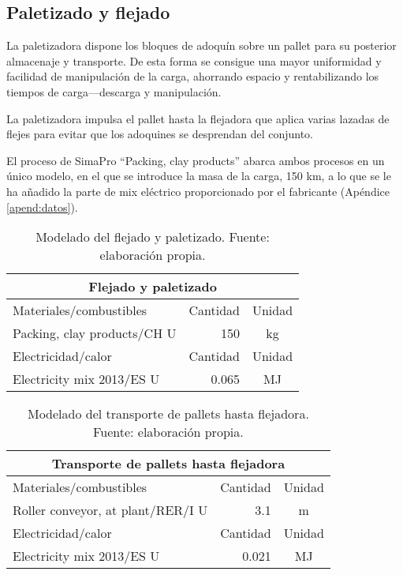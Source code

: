 \subsection{Paletizado y flejado}

La paletizadora dispone los bloques de adoquín sobre un pallet para su posterior almacenaje y transporte. De esta forma se consigue una mayor uniformidad y facilidad de manipulación de la carga, ahorrando espacio y rentabilizando los tiempos de carga—descarga y manipulación.

La paletizadora impulsa el pallet hasta la flejadora que aplica varias lazadas de flejes para evitar que los adoquines se desprendan del conjunto.

El proceso de SimaPro ``Packing, clay products'' abarca ambos procesos en un único modelo, en el que se introduce la masa de la carga, 150 \si{km}, a lo que se le ha añadido la parte de mix eléctrico proporcionado por el fabricante (Apéndice \ref{apend:datos}).

\begin{table}[!htb]
\centering
\begin{tabular}{p{8cm}rc}
\toprule
\multicolumn{3}{c}{Flejado y paletizado}\\
\midrule
Materiales/combustibles & Cantidad & Unidad\\
\midrule
Packing, clay products/CH U & 150 & \si{kg}\\
\midrule
Electricidad/calor & Cantidad & Unidad\\
\midrule
Electricity mix 2013/ES U & 0.065 & \si{MJ}\\
\bottomrule
\end{tabular}
\caption[Modelado del flejado y paletizado.]{Modelado del flejado y paletizado. Fuente: elaboración propia.}
\label{modeladodelflejadoypaletizado}
\end{table}

\begin{table}[!htb]
\centering
\begin{tabular}{p{8cm}rc}
\toprule
\multicolumn{3}{c}{Transporte de pallets hasta flejadora}\\
\midrule
Materiales/combustibles & Cantidad & Unidad\\
\midrule
Roller conveyor, at plant/RER/I U & 3.1 & \si{m}\\
\midrule
Electricidad/calor & Cantidad & Unidad\\
\midrule
Electricity mix 2013/ES U & 0.021 & \si{MJ}\\
\bottomrule
\end{tabular}
\caption[Modelado del transporte de pallets hasta flejadora.]{Modelado del transporte de pallets hasta flejadora. Fuente: elaboración propia.}
\label{modeladopalletsflejadora}
\end{table}

